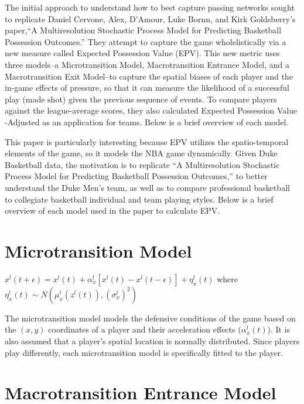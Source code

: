 \documentclass[12pt,twoside]{dukestatscithesis}
\theoremstyle{definition}
\theoremstyle{definition}
\theoremstyle{definition}
\theoremstyle{remark}
\begin{document}
The initial approach to understand how to best capture passing networks
sought to replicate Daniel Cervone, Alex, D'Amour, Luke Bornn, and Kirk
Goldsberry's paper,``A Multiresolution Stochastic Process Model for
Predicting Basketball Possession Outcomes.'' They attempt to capture the
game wholelistically via a new measure called Expected Possession Value
(EPV). This new metric uses three models--a Microtransition Model,
Macrotransition Entrance Model, and a Macrotransition Exit Model--to
capture the spatial biases of each player and the in-game effects of
pressure, so that it can measure the likelihood of a successful play
(made shot) given the previous sequence of events. To compare players
against the league-average scores, they also calculated Expected
Possession Value -Adjusted as an application for teams. Below is a brief
overview of each model.

This paper is particularly interesting because EPV utilizes the
spatio-temporal elements of the game, so it models the NBA game
dynamically. Given Duke Basketball data, the motivation is to replicate
``A Multiresolution Stochastic Process Model for Predicting Basketball
Possession Outcomes,'' to better understand the Duke Men's team, as well
as to compare professional basketball to collegiate basketball
individual and team playing styles. Below is a brief overview of each
model used in the paper to calculate EPV.

\section{Microtransition Model}\label{microtransition-model}

\(x^{l}(t+\epsilon) = x^{l}(t) + \alpha^{l}_{x}[x^{l}(t) - x^{l}(t-\epsilon)] + \eta^{l}_{x}(t)\)
where
\(\eta^{l}_{x}(t) \sim N(\mu^{l}_{x}(z^{l}(t)), (\sigma^{l}_{x})^{2})\)

The microtransition model models the defensive conditions of the game
based on the \((x,y)\) coordinates of a player and their acceleration
effects (\(\alpha^{l}_{x}(t)\)). It is also assumed that a player's
spatial location is normally distributed. Since players play
differently, each microtransition model is specifically fitted to the
player.

\section{Macrotransition Entrance
Model}\label{macrotransition-entrance-model}
\end{document}
